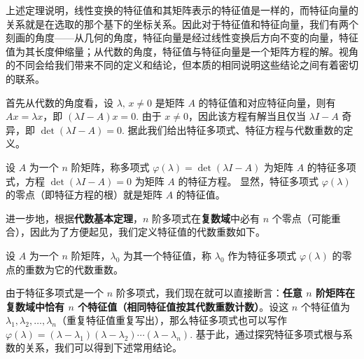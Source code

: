 上述定理说明，线性变换的特征值和其矩阵表示的特征值是一样的，而特征向量的关系就是在选取的那个基下的坐标关系。因此对于特征值和特征向量，我们有两个刻画的角度——从几何的角度，特征向量是经过线性变换后方向不变的向量，特征值为其长度伸缩量；从代数的角度，特征值与特征向量是一个矩阵方程的解。视角的不同会给我们带来不同的定义和结论，但本质的相同说明这些结论之间有着密切的联系。


首先从代数的角度看，设 $\lambda,\,x\neq0$ 是矩阵 $A$ 的特征值和对应特征向量，则有 $Ax=\lambda x$，即 $(\lambda I-A)x=0$. 由于 $x\neq 0$，因此该方程有解当且仅当 $\lambda I-A$ 奇异，即 $\det(\lambda I-A)=0$. 据此我们给出特征多项式、特征方程与代数重数的定义。

\begin{definition}
设 $A$ 为一个 $n$ 阶矩阵，称多项式 $\varphi(\lambda)=\det(\lambda I-A)$ 为矩阵 $A$ 的特征多项式，方程 $\det(\lambda I-A)=0$ 为矩阵 $A$ 的特征方程。
显然，特征多项式 $\varphi(\lambda)$ 的零点（即特征方程的根）就是矩阵 $A$ 的特征值。
\end{definition}

进一步地，根据\textbf{代数基本定理}，$n$ 阶多项式在\textbf{复数域}中必有 $n$ 个零点（可能重合），因此为了方便起见，我们定义特征值的代数重数如下。

\begin{definition}[代数重数]
设 $A$ 为一个 $n$ 阶矩阵，$\lambda_0$ 为其一个特征值，称 $\lambda_0$ 作为特征多项式 $\varphi(\lambda)$ 的零点的重数为它的代数重数。
\end{definition}

由于特征多项式是一个 $n$ 阶多项式，我们现在就可以直接断言：\textbf{任意 $n$ 阶矩阵在复数域中恰有 $n$ 个特征值（相同特征值按其代数重数计数）}。设这 $n$ 个特征值为 $\lambda_1,\lambda_2,\ldots,\lambda_n$（重复特征值重复写出），那么特征多项式也可以写作 $\varphi(\lambda)=(\lambda-\lambda_1)(\lambda-\lambda_2)\cdots(\lambda-\lambda_n)$. 基于此，通过探究特征多项式根与系数的关系，我们可以得到下述常用结论。

